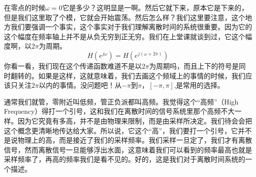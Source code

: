 \documentclass[a4paper,12pt]{article}
\begin{document}
{\centering
{}\par}

在零点的时候$\omega = 0$它是多少？这明显是一啊。然后它就下来，原本它是下来的，但是我们这里取了个模，它就会开始震荡。然后怎么样？我们这里要注意，这个地方我们要强调一个事实，这个事实对于我们理解离散时间的系统很重要。因为它的这个幅度在频率轴上并不是从负无穷到正无穷。我们在上堂课就谈到过，它这个幅度啊，以$2\pi$为周期。
\begin{equation}
    H\left (  e^{j\omega} \right ) = H\left (  e^{j\left (\omega +2\pi \right )} \right ) 
\end{equation}
你看一看，我们现在这个传递函数难道不是以$2\pi$为周期吗，而且上下的符号是同时翻转的。如果是这样，这就意味着，我们去画这个频域上的事情的时候，我们应该只关注$2\pi$以内的事情。没问题吧！从$-\pi$到$\pi$，$\left [-\pi ,\pi \right ] $,是常用的选择。

通常我们就管，零附近叫低频，管正负派都叫高频。我觉得这个“高频”（High Frequency）得打一个引号，这和我们在离散时间的信号系统里那个高频不大一样。因为它究竟有多高，并不是由物理来限制，而是由采样所决定。我们待会会把这个概念更清晰地传达给大家。所以说，它这个“高”，我们要打一个引号，它并不是说物理上的高，而是接近了我们的采样频率。我们采样一旦定了，我们才有离散信号，然而离散信号一旦能够浮出水面，这意味着我们可以看到的频率最高也就是采样频率了，再高的频率我们是看不见的。好的，这是我们对于离散时间系统的一个描述。
\end{document}
